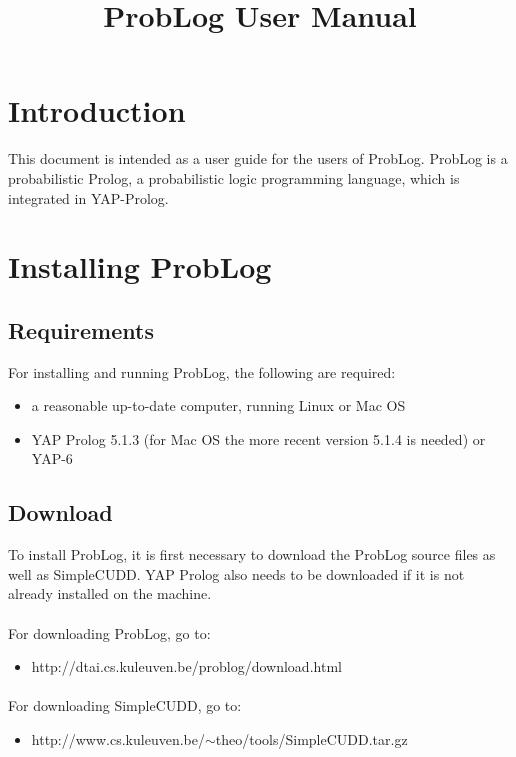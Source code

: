 \documentclass[a4paper,12pt]{article}
\author{}
\title{ProbLog User Manual}
\begin{document}
\maketitle

\newpage

\tableofcontents

\newpage

\section{Introduction}

This document is intended as a user guide for the users of ProbLog. ProbLog is a probabilistic Prolog, a probabilistic logic programming language, which is integrated in YAP-Prolog.

\section{Installing ProbLog}

\subsection{Requirements}

For installing and running ProbLog, the following are required:
\begin{itemize}
 \item a reasonable up-to-date computer, running Linux or Mac OS
 \item YAP Prolog 5.1.3 (for Mac OS the more recent version 5.1.4 is needed) or YAP-6
\end{itemize}

\subsection{Download}
To install ProbLog, it is first necessary to download the ProbLog source files as well as SimpleCUDD. YAP Prolog also needs to be downloaded if it is not already installed on the machine.
\paragraph{}
For downloading ProbLog, go to: 
\begin{itemize}
 \item http://dtai.cs.kuleuven.be/problog/download.html
\end{itemize}
\paragraph{}
For downloading SimpleCUDD, go to: 
\begin{itemize}
 \item http://www.cs.kuleuven.be/$\sim$theo/tools/SimpleCUDD.tar.gz
\end{itemize}
\end{document}
